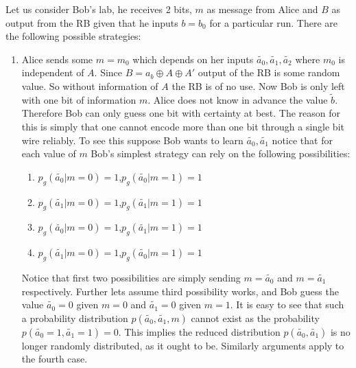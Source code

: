 Let us consider Bob's lab, he receives 2 bits, $m$ as message from Alice and $B$ as output from the RB given that he inputs $b=b_0$ for a particular run. 
There are the following possible strategies:
\begin{enumerate}
\item Alice sends some $m=m_0$ which depends on her inputs $\tilde{a_0},\tilde{a_1},\tilde{a_2}$ where $m_0$ is independent of $A$. Since $B=a_b\oplus A \oplus A'$ output of the RB is some random value. So without information of $A$ the RB is of no use. Now Bob is only left with one bit of information $m$. Alice does not know in advance the value $\tilde{b}$. Therefore Bob can only guess one bit with certainty at best. The reason for this is simply that one cannot encode more than one bit through a single bit wire reliably. To see this suppose Bob wants to learn $\tilde{a_0},\tilde{a_1}$ notice that for each value of $m$ Bob's simplest strategy can rely on the following possibilities:
\begin{enumerate}
\item $p_g(\tilde{a_0}|m=0)=1$,$p_g(\tilde{a_0}|m=1)=1$
\item $p_g(\tilde{a_1}|m=0)=1$,$p_g(\tilde{a_1}|m=1)=1$
\item $p_g(\tilde{a_0}|m=0)=1$,$p_g(\tilde{a_1}|m=1)=1$
\item $p_g(\tilde{a_1}|m=0)=1$,$p_g(\tilde{a_0}|m=1)=1$
\end{enumerate}
Notice that first two possibilities are simply sending $m=\tilde{a_0}$ and $m=\tilde{a_1}$ respectively. Further lets assume third possibility works, and Bob guess the value $\tilde{a_0}=0$ given $m=0$ and $\tilde{a_1}=0$ given $m=1$. It is easy to see that such a probability distribution $p(\tilde{a_0},\tilde{a_1},m)$ cannot exist as the probability $p(\tilde{a_0}=1,\tilde{a_1}=1)=0$. This implies the reduced distribution $p(\tilde{a_0},\tilde{a_1})$ is no longer randomly distributed, as it ought to be. Similarly arguments apply to the fourth case.


\end{enumerate}

